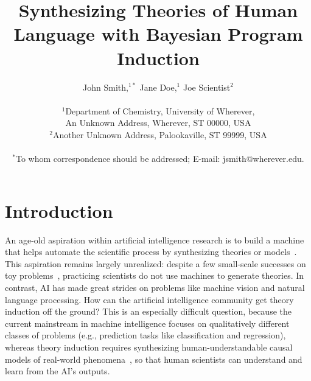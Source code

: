 \documentclass[12pt]{article}
\title{Synthesizing Theories of Human Language with Bayesian Program Induction}
\author
{John Smith,$^{1\ast}$ Jane Doe,$^{1}$ Joe Scientist$^{2}$\\
\\
\normalsize{$^{1}$Department of Chemistry, University of Wherever,}\\
\normalsize{An Unknown Address, Wherever, ST 00000, USA}\\
\normalsize{$^{2}$Another Unknown Address, Palookaville, ST 99999, USA}\\
\\
\normalsize{$^\ast$To whom correspondence should be addressed; E-mail:  jsmith@wherever.edu.}
}
\date{}
\newenvironment{sciabstract}{%
\begin{quote} \bf}
{\end{quote}}
\begin{document}
 


\baselineskip24pt


\maketitle 




\begin{sciabstract}
\end{sciabstract}




\section*{Introduction}

An age-old aspiration within artificial intelligence research is to
build a machine that helps automate the scientific process by
synthesizing theories or
models~\cite{paul1990autonomous,langley1987scientific,schmidt2009distilling}.
This aspiration remains largely unrealized: despite a few
small-scale successes on toy problems~\cite{Langley1981BACON5TD},
practicing scientists do not use machines to generate theories.
In contrast, AI has made great strides
on problems like machine vision and natural language processing.  How
can the artificial intelligence community get theory induction off the
ground?  This is an especially difficult question, because the current
mainstream in machine intelligence focuses on qualitatively different
classes of problems (e.g., prediction tasks like classification and
regression), whereas theory induction requires synthesizing
human-understandable causal models of real-world
phenomena~\cite{pearl2009causality}, so that human scientists can
understand and learn from the AI's outputs.
\end{document}
